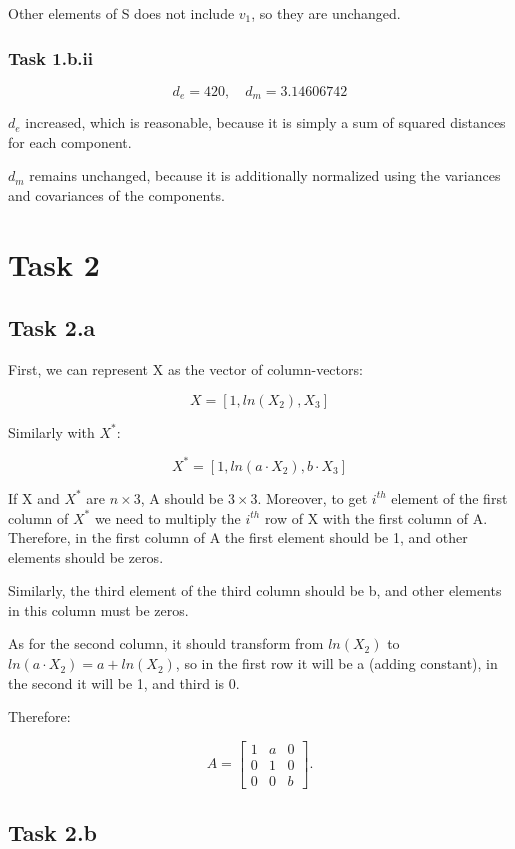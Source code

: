 \documentclass[12pt]{article}
\begin{document}
Other elements of S does not include $v_1$, so they are unchanged.

\subsubsection*{Task 1.b.ii}

\[
d_e = 420, \quad d_m = 3.14606742
\]

$d_e$ increased, which is reasonable, because it is simply a sum of squared distances for each component.

$d_m$ remains unchanged, because it is additionally normalized using the variances and covariances of the components.

\section*{Task 2}

\subsection*{Task 2.a}

First, we can represent X as the vector of column-vectors:

\[X = [1, ln(X_2), X_3]\]

Similarly with $X^*$:

\[X^* = [1, ln(a\cdot X_2), b\cdot X_3]\]

If X and $X^*$ are $n \times 3$, A should be $3\times 3$. Moreover, to get $i^{th}$ element of the first column of $X^*$ we need to multiply the $i^{th}$ row of X with the first column of A. Therefore, in the first column of A the first element should be 1, and other elements should be zeros.

Similarly, the third element of the third column should be b, and other elements in this column must be zeros.

As for the second column, it should transform from $ln(X_2)$ to $ln(a\cdot X_2) = a + ln(X_2)$, so in the first row it will be a (adding constant), in the second it will be 1, and third is 0.

Therefore:

\[
A =
\begin{bmatrix}
1 & a & 0 \\[4pt]
0 & 1 & 0 \\[4pt]
0 & 0 & b
\end{bmatrix}.
\]

\subsection*{Task 2.b}
\end{document}
